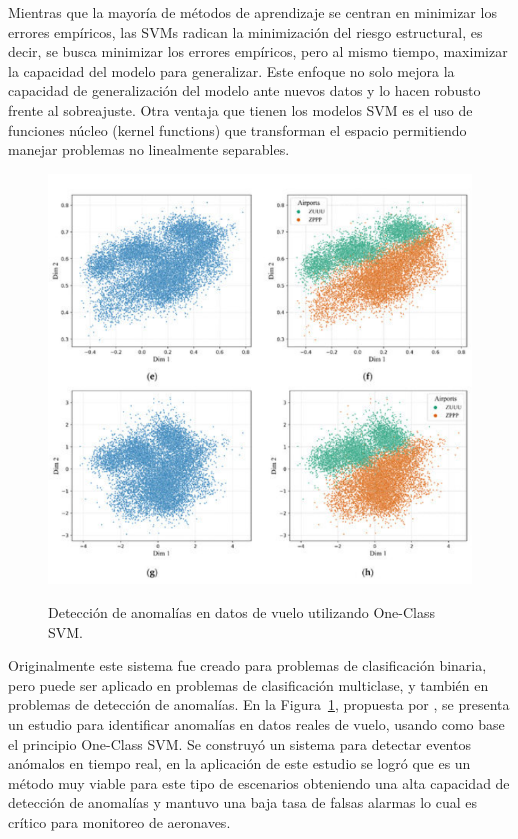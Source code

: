 \documentclass[11pt,a4paper,spanish]{book}
\numberwithin{equation}{chapter}
\numberwithin{figure}{chapter}
\begin{document}
Mientras que la mayoría de métodos de aprendizaje se centran en minimizar los errores 
empíricos, las SVMs radican la minimización del riesgo estructural, es decir, se busca 
minimizar los errores empíricos, pero al mismo tiempo, maximizar la capacidad del modelo 
para generalizar. Este enfoque no solo mejora la capacidad de generalización del modelo 
ante nuevos datos y lo hacen robusto frente al sobreajuste. Otra ventaja que tienen los 
modelos SVM es el uso de funciones núcleo (kernel functions) que transforman el espacio 
permitiendo manejar problemas no linealmente separables. 


\begin{figure}[h]
	\caption{Detección de anomalías en datos de vuelo utilizando One-Class SVM. \protect\cite{qin2022flight}}
    \centering
    \includegraphics[width=1.0\textwidth]{media/svm-kun.png}
    \label{fig:figSVMflight}
\end{figure}


Originalmente este sistema fue creado para problemas de clasificación binaria, pero 
puede ser aplicado en problemas de clasificación multiclase, y también en problemas de 
detección de anomalías. En la Figura~\ref{fig:figSVMflight}, propuesta por 
\cite{qin2022flight}, se presenta un estudio para identificar anomalías en datos reales 
de vuelo, usando como base el principio One-Class SVM. Se construyó un sistema para 
detectar eventos anómalos en tiempo real, en la aplicación de este estudio se logró que 
es un método muy viable para este tipo de escenarios obteniendo una alta capacidad de 
detección de anomalías y mantuvo una baja tasa de falsas alarmas lo cual es crítico para 
monitoreo de aeronaves.
\end{document}
